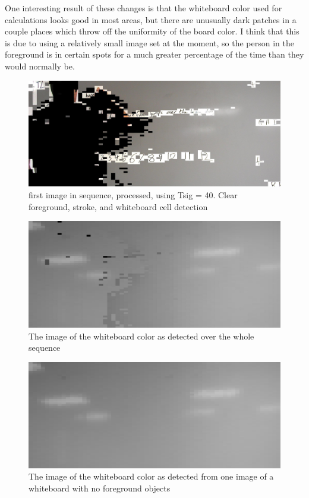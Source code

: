 \documentclass[]{article}
\begin{document}
		One interesting result of these changes is that the whiteboard color used for calculations looks good in most areas, but there are unusually dark patches in a couple places which throw off the uniformity of the board color.  I think that this is due to using a relatively small image set at the moment, so the person in the foreground is in certain spots for a much greater percentage of the time than they would normally be.

\begin{figure}[H]
\centering
\includegraphics[scale=0.25]{images/griffin_foreground1}
\caption{first image in sequence, processed, using Tsig = 40.  Clear foreground, stroke, and whiteboard cell detection}
\end{figure}
		
\begin{figure}[H]
\centering
\includegraphics[scale=0.25]{images/background_overtime}
\caption{The image of the whiteboard color as detected over the whole sequence}
\end{figure}	

\begin{figure}[H]
\centering
\includegraphics[scale=0.2]{images/whiteboard_single}
\caption{The image of the whiteboard color as detected from one image of a whiteboard with no foreground objects}
\end{figure}		
\end{document}
